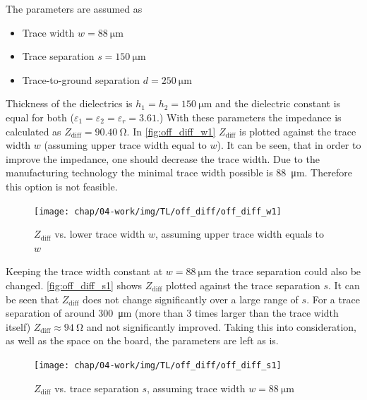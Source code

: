 The parameters are assumed as
\begin{itemize}
	\item Trace width $w = \SI{88}{\micro \meter}$ 
	\item Trace separation $s = \SI{150}{\micro \meter}$
	\item Trace-to-ground separation $d = \SI{250}{\micro \meter}$
\end{itemize}
Thickness of the dielectrics is $h_1 = h_2 = \SI{150}{\micro \meter}$  and the dielectric constant is equal for both ($\varepsilon_1 = \varepsilon_2 = \varepsilon_r = 3.61$.)
With these parameters the impedance is calculated as $Z_\text{diff} = \SI{90.40}{\ohm}$.
In \autoref{fig:off_diff_w1} $Z_\text{diff}$ is plotted against the trace width $w$ (assuming upper trace width equal to $w$). It can be seen, that in order to improve the impedance, one should decrease the trace width. 
Due to the manufacturing technology the minimal trace width possible is \SI{88}{\micro \meter}. 
Therefore this option is not feasible.

\begin{figure}[tbh]
	\centering
	\texttt{[image: chap/04-work/img/TL/off\_diff/off\_diff\_w1]}
	\caption[DOWG, $Z_\text{diff}$ vs. $w$]{$Z_\text{diff}$ vs. lower trace width $w$, assuming upper trace width equals to $w$}
	\label{fig:off_diff_w1}
\end{figure}

Keeping the trace width constant at $w = \SI{88}{\micro \meter}$ the trace separation could also be changed.
\autoref{fig:off_diff_s1} shows $Z_\text{diff}$ plotted against the trace separation $s$.
It can be seen that $Z_\text{diff}$ does not change significantly over a large range of $s$.
For a trace separation of around \SI{300}{\micro \meter} (more than 3 times larger than the trace width itself) $Z_\text{diff} \approx \SI{94}{\ohm}$ and not significantly improved.
Taking this into consideration, as well as the space on the board, the parameters are left as is.  
\begin{figure}[tbh]
	\centering
	\texttt{[image: chap/04-work/img/TL/off\_diff/off\_diff\_s1]}
	\caption[DOWG, $Z_\text{diff}$ vs. $s$]{$Z_\text{diff}$ vs. trace separation $s$, assuming trace width $w = \SI{88}{\micro \meter}$}
	\label{fig:off_diff_s1}
\end{figure}

